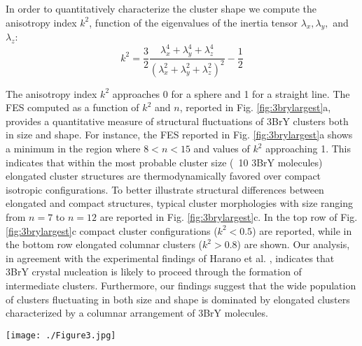 \documentclass[journal=cgdefu,manuscript=article,layout=twocolumn]{achemso}
\begin{document}
In order to quantitatively characterize the cluster shape we compute the anisotropy index $k^2$, function of the eigenvalues of the inertia tensor $\lambda_x, \lambda_y,$ and $\lambda_z$:   
\begin{equation}
 k^2 = 
\frac{3}{2}\frac{\lambda_x^4+\lambda_y^4+\lambda_z^4}{
(\lambda_x^2+\lambda_y^2+\lambda_z^2)^2 } -\frac{1}{2}
\label{eqn:shape}
\end{equation}

The anisotropy index $k^2$ approaches 0 for a sphere and 1 for a straight line\cite{theodorou1985shape}.
The FES computed as a function of $k^2$ and $n$, reported in Fig. \ref{fig:3brylargest}a, provides a quantitative measure of structural fluctuations of 3BrY clusters both in size and shape. For instance, the FES reported in  Fig. \ref{fig:3brylargest}a shows a minimum in the region where $8<n<15$ and values of $k^2$ approaching 1. 
This indicates that within the most probable cluster size (~10 3BrY molecules) elongated cluster structures are thermodynamically favored over compact isotropic configurations.  
To better illustrate structural differences between elongated and compact structures, typical cluster morphologies with size ranging from $n=7$ to $n=12$ are reported in Fig. \ref{fig:3brylargest}c. In the top row of Fig. \ref{fig:3brylargest}c compact cluster configurations ($k^2<0.5$) are reported, while in the bottom row elongated columnar clusters ($k^2>0.8$) are shown. Our analysis, in agreement with the experimental findings of Harano et al. \cite{harano2012heterogeneous}, indicates that 3BrY crystal nucleation is likely to proceed through the formation of intermediate clusters. Furthermore, our findings suggest that the wide population of clusters fluctuating in both size and shape is dominated by elongated clusters characterized by a columnar arrangement of 3BrY molecules. 

\begin{figure*}[ht!]
\centering
\texttt{[image: ./Figure3.jpg]}
\caption{Simulation B. A) FES obtained from the unbiased simulations as a function of the shape anisotropy $k^2$ and the number of 3BrY molecules in a cluster $n$. B) The probability distribution of the size of the largest cluster in the unbiased simulations obtained as a function of the number of monomers $n$. C) cluster structures illustrating the shape flexibility possessed by the precursor: on the top row compact isotropic structures characterized by a $k^2<0.5$ are reported, while on the bottom row elongated, rod-like structures characterized by $k^2>0.8$ are depicted.}
\label{fig:3brylargest}
\end{figure*}  
\end{document}
